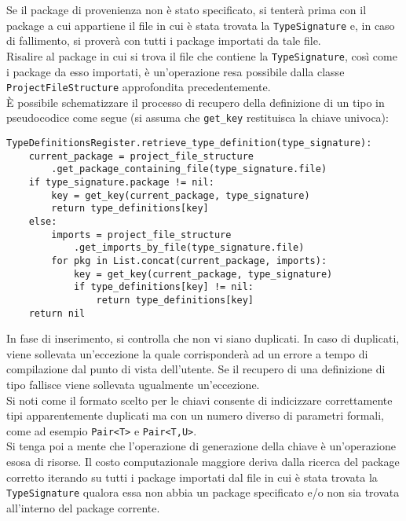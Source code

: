Se il package di provenienza non è stato specificato, si tenterà prima con il package a cui appartiene il file 
in cui è stata trovata la \texttt{TypeSignature} e, in caso di fallimento, si proverà con tutti i package 
importati da tale file. \\

Risalire al package in cui si trova il file che contiene la \texttt{TypeSignature}, così come i package da esso importati, 
è un'operazione resa possibile dalla classe \texttt{ProjectFileStructure} approfondita precedentemente. \\


È possibile schematizzare il processo di recupero della definizione di un tipo in pseudocodice come segue
(si assuma che \texttt{get\_key} restituisca la chiave univoca): \\

\vspace{0.5cm}
\begin{lstlisting}[frame=single]
TypeDefinitionsRegister.retrieve_type_definition(type_signature):
    current_package = project_file_structure
        .get_package_containing_file(type_signature.file)
    if type_signature.package != nil:
        key = get_key(current_package, type_signature)
        return type_definitions[key]
    else:
        imports = project_file_structure
            .get_imports_by_file(type_signature.file)
        for pkg in List.concat(current_package, imports):
            key = get_key(current_package, type_signature)
            if type_definitions[key] != nil:
                return type_definitions[key]
    return nil
\end{lstlisting}
\vspace{0.5cm}

In fase di inserimento, si controlla che non vi siano duplicati. In caso di duplicati, viene 
sollevata un'eccezione la quale corrisponderà ad un errore a tempo di compilazione dal punto 
di vista dell'utente. Se il recupero di una definizione di tipo fallisce viene sollevata 
ugualmente un'eccezione. \\

Si noti come il formato scelto per le chiavi consente di indicizzare correttamente tipi 
apparentemente duplicati ma con un numero diverso di parametri formali, come ad esempio 
\texttt{Pair<T>} e \texttt{Pair<T,U>}. \\

Si tenga poi a mente che l'operazione di generazione della chiave è un'operazione esosa di risorse.
Il costo computazionale maggiore deriva dalla ricerca del package corretto iterando su tutti i package
importati dal file in cui è stata trovata la \texttt{TypeSignature} qualora essa non abbia un 
package specificato e/o non sia trovata all'interno del package corrente. \\

